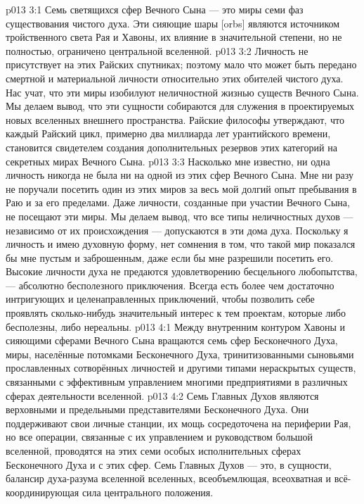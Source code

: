 \vs p013 3:1 Семь светящихся сфер Вечного Сына --- это миры семи фаз существования чистого духа. Эти сияющие шары [orbs] являются источником тройственного света Рая и Хавоны, их влияние в значительной степени, но не полностью, ограничено центральной вселенной.
\vs p013 3:2 Личность не присутствует на этих Райских спутниках; поэтому мало что может быть передано смертной и материальной личности относительно этих обителей чистого духа. Нас учат, что эти миры изобилуют неличностной жизнью существ Вечного Сына. Мы делаем вывод, что эти сущности собираются для служения в проектируемых новых вселенных внешнего пространства. Райские философы утверждают, что каждый Райский цикл, примерно два миллиарда лет урантийского времени, становится свидетелем создания дополнительных резервов этих категорий на секретных мирах Вечного Сына.
\vs p013 3:3 \pc Насколько мне известно, ни одна личность никогда не была ни на одной из этих сфер Вечного Сына. Мне ни разу не поручали посетить один из этих миров за весь мой долгий опыт пребывания в Раю и за его пределами. Даже личности, созданные при участии Вечного Сына, не посещают эти миры. Мы делаем вывод, что все типы неличностных духов --- независимо от их происхождения --- допускаются в эти дома духа. Поскольку я личность и имею духовную форму, нет сомнения в том, что такой мир показался бы мне пустым и заброшенным, даже если бы мне разрешили посетить его. Высокие личности духа не предаются удовлетворению бесцельного любопытства, --- абсолютно бесполезного приключения. Всегда есть более чем достаточно интригующих и целенаправленных приключений, чтобы позволить себе проявлять сколько\hyp{}нибудь значительный интерес к тем проектам, которые либо бесполезны, либо нереальны.
\vs p013 4:1 Между внутренним контуром Хавоны и сияющими сферами Вечного Сына вращаются семь сфер Бесконечного Духа, миры, населённые потомками Бесконечного Духа, тринитизованными сыновьями прославленных сотворённых личностей и другими типами нераскрытых существ, связанными с эффективным управлением многими предприятиями в различных сферах деятельности вселенной.
\vs p013 4:2 Семь Главных Духов являются верховными и предельными представителями Бесконечного Духа. Они поддерживают свои личные станции, их мощь сосредоточена на периферии Рая, но все операции, связанные с их управлением и руководством большой вселенной, проводятся на этих семи особых исполнительных сферах Бесконечного Духа и с этих сфер. Семь Главных Духов --- это, в сущности, балансир духа\hyp{}разума вселенной вселенных, всеобъемлющая, всеохватная и всё\hyp{}координирующая сила центрального положения.
